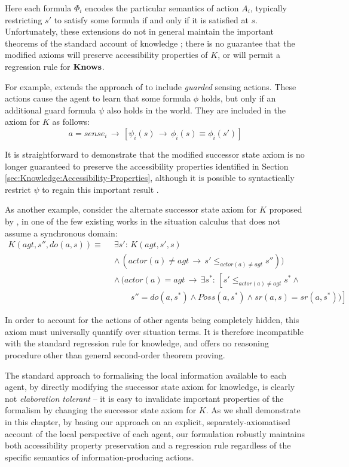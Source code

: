 Here each formula $\Phi_{i}$ encodes the particular semantics of
action $A_{i}$, typically restricting $s'$ to satisfy some formula
if and only if it is satisfied at $s$. Unfortunately, these extensions
do not in general maintain the important theorems of the standard
account of knowledge \citep{scherl03sc_knowledge}; there is no guarantee
that the modified axioms will preserve accessibility properties of
$K$, or will permit a regression rule for $\mathbf{Knows}$.

For example, \citet{Petrick06thesis} extends the approach of \citep{scherl03sc_knowledge}
to include \emph{guarded} sensing actions. These actions cause the
agent to learn that some formula $\phi$ holds, but only if an additional
guard formula $\psi$ also holds in the world. They are included in
the axiom for $K$ as follows:\[
a=sense_{i}\,\rightarrow\,\left[\psi_{i}(s)\,\rightarrow\,\phi_{i}(s)\equiv\phi_{i}(s')\right]\]


It is straightforward to demonstrate that the modified successor state
axiom is no longer guaranteed to preserve the accessibility properties
identified in Section \ref{sec:Knowledge:Accessibility-Properties},
although it is possible to syntactically restrict $\psi$ to regain
this important result \citep{Petrick06thesis}.

As another example, consider the alternate successor state axiom for
$K$ proposed by \citet{Lesperance99sitcalc_approach}, in one of
the few existing works in the situation calculus that does not assume
a synchronous domain:\begin{align*}
K(agt,s'',do(a,s))\equiv\,\,\, & \exists s':\, K(agt,s',s)\\
 & \wedge\,(actor(a)\neq agt\,\rightarrow\, s'\leq_{actor(a)\neq agt}s''))\\
 & \wedge\,(actor(a)=agt\,\rightarrow\,\exists s^{*}:\,\left[s'\leq_{actor(a)\neq agt}s^{*}\wedge\right.\\
 & \,\,\,\,\,\,\,\,\,\,\,\,\left.s''=do(a,s^{*})\wedge Poss(a,s^{*})\wedge sr(a,s)=sr(a,s^{*}))\right]\end{align*}


In order to account for the actions of other agents being completely
hidden, this axiom must universally quantify over situation terms.
It is therefore incompatible with the standard regression rule for
knowledge, and \citep{Lesperance99sitcalc_approach} offers no reasoning
procedure other than general second-order theorem proving.

The standard approach to formalising the local information available
to each agent, by directly modifying the successor state axiom for
knowledge, is clearly not \emph{elaboration tolerant} -- it is easy
to invalidate important properties of the formalism by changing the
successor state axiom for $K$. As we shall demonstrate in this chapter,
by basing our approach on an explicit, separately-axiomatised account
of the local perspective of each agent, our formulation robustly maintains
both accessibility property preservation and a regression rule regardless
of the specific semantics of information-producing actions.


